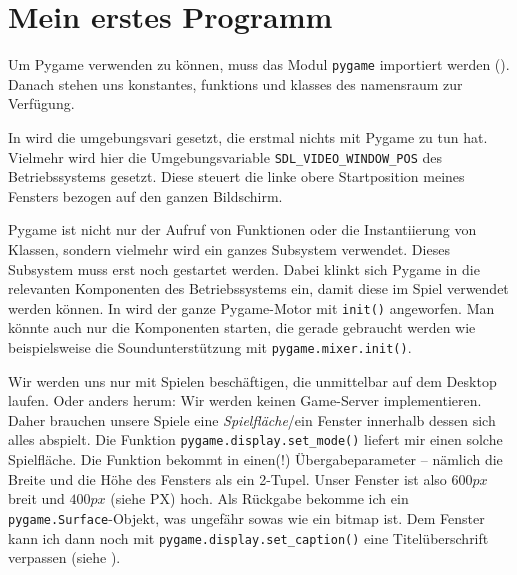 \section{Mein erstes Programm}


Um Pygame verwenden zu können, muss das Modul \texttt{pygame} importiert werden (). Danach stehen uns \glspl{konstante}, \glspl{funktion} und \glspl{klasse} des \Gls{namensraum} zur Verfügung. 

In   wird die \Gls{umgebungsvari} gesetzt, die erstmal nichts mit Pygame zu tun hat. Vielmehr wird hier die Umgebungsvariable \texttt{SDL\_VIDEO\_WINDOW\_POS} des Betriebssystems gesetzt. Diese steuert die linke obere Startposition meines Fensters bezogen auf den ganzen Bildschirm. 

Pygame ist nicht nur der Aufruf von Funktionen oder die Instantiierung von Klassen, sondern vielmehr wird ein ganzes Subsystem verwendet. Dieses Subsystem muss erst noch gestartet werden. Dabei klinkt sich Pygame in die relevanten Komponenten des Betriebssystems ein, damit diese im Spiel verwendet werden können. In  wird der ganze Pygame-Motor mit \texttt{init()} angeworfen. Man könnte auch nur die Komponenten starten, die gerade gebraucht werden wie beispielsweise die Soundunterstützung mit \texttt{pygame.mixer.init()}.

Wir werden uns nur mit Spielen beschäftigen, die unmittelbar auf dem Desktop laufen. Oder anders herum: Wir werden keinen Game-Server implementieren. Daher brauchen unsere Spiele eine \emph{Spielfläche}/ein Fenster innerhalb dessen sich alles abspielt. Die Funktion \texttt{pygame.display.set\_mode()} liefert mir einen solche Spielfläche. Die Funktion bekommt in  einen(!) Übergabeparameter -- nämlich die Breite und die Höhe des Fensters als ein 2-Tupel. Unser Fenster ist also $600px$ breit und $400px$ (siehe \Gls{PX}) hoch. Als Rückgabe bekomme ich ein \texttt{pygame.Surface}-Objekt, was ungefähr sowas wie ein \Gls{bitmap} ist. Dem Fenster kann ich dann noch mit \texttt{pygame.display.set\_caption()} eine Titelüberschrift verpassen (siehe ).

